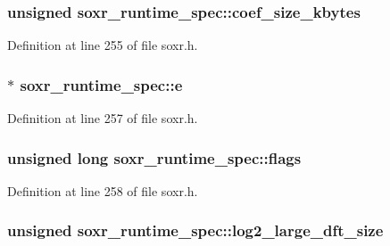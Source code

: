 \subsubsection[{\texorpdfstring{coef\+\_\+size\+\_\+kbytes}{coef_size_kbytes}}]{\setlength{\rightskip}{0pt plus 5cm}unsigned soxr\+\_\+runtime\+\_\+spec\+::coef\+\_\+size\+\_\+kbytes}\hypertarget{structsoxr__runtime__spec_ab54d2119bf00a8060aec27c6fe09a125}{}\label{structsoxr__runtime__spec_ab54d2119bf00a8060aec27c6fe09a125}


Definition at line 255 of file soxr.\+h.

\subsubsection[{\texorpdfstring{e}{e}}]{$\ast$ soxr\+\_\+runtime\+\_\+spec\+::e}\hypertarget{structsoxr__runtime__spec_a41f0eaf7fc642056411684a9b06a3385}{}\label{structsoxr__runtime__spec_a41f0eaf7fc642056411684a9b06a3385}


Definition at line 257 of file soxr.\+h.

\subsubsection[{\texorpdfstring{flags}{flags}}]{\setlength{\rightskip}{0pt plus 5cm}unsigned long soxr\+\_\+runtime\+\_\+spec\+::flags}\hypertarget{structsoxr__runtime__spec_a35b619aa4322f91fa5a2c06b148c9f2a}{}\label{structsoxr__runtime__spec_a35b619aa4322f91fa5a2c06b148c9f2a}


Definition at line 258 of file soxr.\+h.

\subsubsection[{\texorpdfstring{log2\+\_\+large\+\_\+dft\+\_\+size}{log2_large_dft_size}}]{\setlength{\rightskip}{0pt plus 5cm}unsigned soxr\+\_\+runtime\+\_\+spec\+::log2\+\_\+large\+\_\+dft\+\_\+size}\hypertarget{structsoxr__runtime__spec_ad9fd2490deceec50026bfc54b6486cb2}{}\label{structsoxr__runtime__spec_ad9fd2490deceec50026bfc54b6486cb2}


